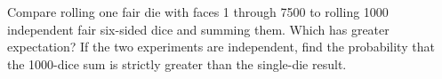 Compare rolling one fair die with faces 1 through 7500 to rolling 1000 independent fair six-sided dice and summing them. Which has greater expectation? If the two experiments are independent, find the probability that the 1000-dice sum is strictly greater than the single-die result.
